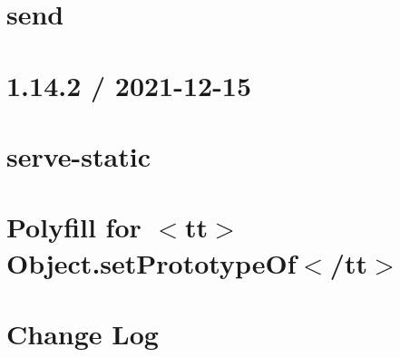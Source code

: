 \documentclass[twoside]{book}
\newcommand{\+}{\discretionary{\mbox{\scriptsize$\hookleftarrow$}}{}{}}
\begin{document}
\chapter{send}
\label{md__c___users_vaishnavi_jadhav__desktop__developer_code_mean_stack_example_server_node_modules_send__r_e_a_d_m_e}

\chapter{1.14.2 / 2021-\/12-\/15}
\label{md__c___users_vaishnavi_jadhav__desktop__developer_code_mean_stack_example_server_node_modules_serve_static__h_i_s_t_o_r_y}

\chapter{serve-\/static}
\label{md__c___users_vaishnavi_jadhav__desktop__developer_code_mean_stack_example_server_node_modules_serve_static__r_e_a_d_m_e}

\chapter{Polyfill for \texorpdfstring{$<$}{<}tt\texorpdfstring{$>$}{>}Object.\+set\+Prototype\+Of\texorpdfstring{$<$}{<}/tt\texorpdfstring{$>$}{>}}
\label{md__c___users_vaishnavi_jadhav__desktop__developer_code_mean_stack_example_server_node_modules_setprototypeof__r_e_a_d_m_e}

\chapter{Change Log}
\label{md__c___users_vaishnavi_jadhav__desktop__developer_code_mean_stack_example_server_node_modules_sdce2a6f634274ba39473be4d3c1e9c7b}

\end{document}

